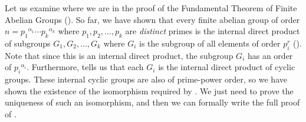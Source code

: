 Let us examine where we are in the proof of the Fundamental Theorem of Finite Abelian Groups (). So far, we have shown that every finite abelian group of order $n = {p_1}^{\alpha_1}\cdots{p_k}^{\alpha_k}$ where $p_1, p_2, \dots, p_k$ are \textit{distinct} primes is the internal direct product of subgroups $G_1, G_2, \dots, G_k$ where $G_i$ is the subgroup of all elements of order $p_i^r$ (). Note that since this is an internal direct product, the subgroup $G_i$ has an order of ${p_i}^{\alpha_i}$. Furthermore,  tells us that each $G_i$ is the internal direct product of cyclic groups. These internal cyclic groups are also of prime-power order, so we have shown the existence of the isomorphism required by . We just need to prove the uniqueness of such an isomorphism, and then we can formally write the full proof of .

